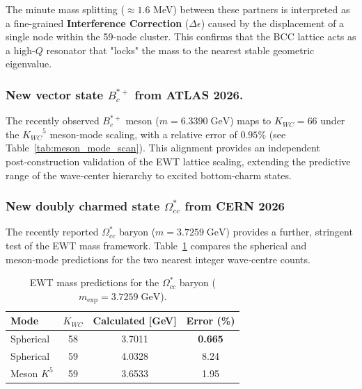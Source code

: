\documentclass[10pt,a4paper]{article}
\begin{document}
The minute mass splitting ($\approx 1.6$ MeV) between these partners is interpreted as a fine-grained \textbf{Interference Correction} ($\Delta \epsilon$) caused by the displacement of a single node within the 59-node cluster. This confirms that the BCC lattice acts as a high-$Q$ resonator that "locks" the mass to the nearest stable geometric eigenvalue.

\subsubsection{New vector state \(B_c^{*+}\) from ATLAS 2026.}
The recently observed \(B_c^{*+}\) meson \cite{ATLAS2026Bcstar}
(\(m = 6.3390\;\text{GeV}\)) maps to $K_{WC}=66$ under the
\({K_{WC}}^5\) meson-mode scaling, with a relative error of
\(0.95\%\) (see Table~\ref{tab:meson_mode_scan}).
This alignment provides an independent
post‑construction validation of the EWT lattice scaling,
extending the predictive range of the wave‑center hierarchy
to excited bottom‑charm states.

\subsubsection{New doubly charmed state \(\Omega_{cc}^*\) from CERN 2026}
\label{subsec:omega_cc_star}

The recently reported \(\Omega_{cc}^*\) baryon \cite{CERN2026OmegaCC}
(\(m = 3.7259\;\text{GeV}\)) provides a further, stringent test of the
EWT mass framework.  Table~\ref{tab:omega_cc_star} compares the
spherical and meson‑mode predictions for the two nearest integer
wave‑centre counts.

\begin{table}[ht]
	\centering
	\caption{EWT mass predictions for the \(\Omega_{cc}^*\) baryon
		(\(m_{\text{exp}} = 3.7259\;\text{GeV}\)).}
	\label{tab:omega_cc_star}
	\begin{tabular}{lccc}
		\toprule
		\textbf{Mode} & \(K_{WC}\) & \textbf{Calculated [GeV]} & \textbf{Error (\%)} \\
		\midrule
		Spherical & 58 & 3.7011 & \textbf{0.665} \\
		Spherical & 59 & 4.0328 & 8.24 \\
		Meson \(K^5\) & 59 & 3.6533 & 1.95 \\
		\bottomrule
	\end{tabular}
\end{table}
\end{document}
